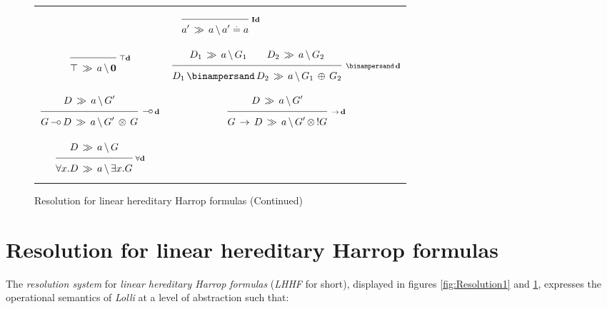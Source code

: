 \clearpage
\begin{figure}[t]
  \begin{center}
    \leavevmode

    \begin{tabular}{|cc|}
      \hline &\\
      \multicolumn{2}{|c|}{
        $\ruleI
          {}
          {\decd{a'}{a}{\eq{a'}{a}}}
          {I d}$}
      \\&\\
      $\ruleI
        {}
        {\decd{\Top}{a}{\Zero}}
        {\Top d}$
      &
      $\ruleII
        {\decd{D_1}{a}{G_1}}
        {\decd{D_2}{a}{G_2}}
        {\decd{D_1 \With D_2}{a}{G_1 \Plus G_2}}
        {\With d}$
      \\&\\

      $\ruleI
        {\decd{D}{a}{G'}}
        {\decd{G \Lolli D}{a}{G' \Times G}}
        {\Lolli d}$
      &
      $\ruleI
        {\decd{D}{a}{G'}}
        {\decd{G \Imp D}{a}{G' \Times !G}}
        {\Imp d}$
      \\&\\

      $\ruleI
        {\decd{D}{a}{G}}
        {\decd{\A x. D}{a}{\E x. G}}
        {\A d}$
      &\\
      \hline
    \end{tabular}

    \caption{Resolution for linear hereditary Harrop formulas (Continued)}
    \label{fig:Resolution2}
  \end{center}
\end{figure}
\hspace*{1em}

\newpage
\section{Resolution for linear hereditary Harrop formulas}
\label{s:Resolution}

The {\em resolution system\/} \cite{Pfe95} for {\em linear hereditary Harrop
  formulas\/} ({\em LHHF\/} for short), displayed in figures
\ref{fig:Resolution1} and \ref{fig:Resolution2}, expresses the operational
semantics of {\em Lolli} at a level of abstraction such that:

